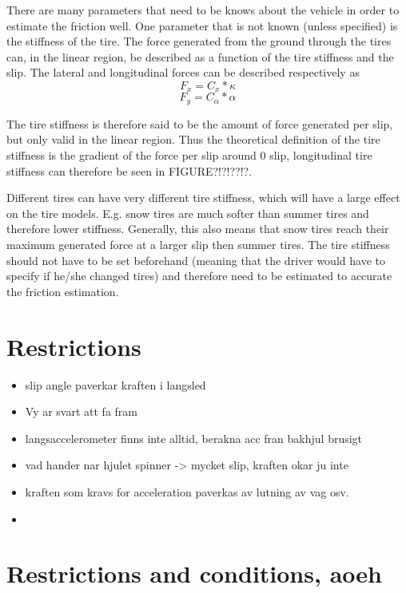There are many parameters that need to be knows about the vehicle in order to estimate the friction well. One parameter that is not known (unless specified) is the stiffness of the tire. The force generated from the ground through the tires can, in the linear region, be described as a function of the tire stiffness and the slip. The lateral and longitudinal forces can be described respectively as
\begin{equation}
	F_{x} = C_{x}*\kappa
\end{equation}
\begin{equation}
	F_{y} = C_{\alpha}*\alpha
\end{equation}

The tire stiffness is therefore said to be the amount of force generated per slip, but only valid in the linear region. Thus the theoretical definition of the tire stiffness is the gradient of the force per slip around 0 slip, longitudinal tire stiffness can therefore be seen in FIGURE?!?!??!?. 

Different tires can have very different tire stiffness, which will have a large effect on the tire models. E.g. snow tires are much softer than summer tires and therefore lower stiffness. Generally, this also means that snow tires reach their maximum generated force at a larger slip then summer tires. The tire stiffness should not have to be set beforehand (meaning that the driver would have to specify if he/she changed tires) and therefore need to be estimated to accurate the friction estimation.
\section{Restrictions}

\begin{itemize}
	\item slip angle paverkar kraften i langsled
	\item Vy ar svart att fa fram
	\item langsaccelerometer finns inte alltid, berakna acc fran bakhjul brusigt
	\item vad hander nar hjulet spinner -> mycket slip, kraften okar ju inte
	\item kraften som kravs for acceleration paverkas av lutning av vag osv.
	\item 
\end{itemize}

\section{Restrictions and conditions, aoeh}

